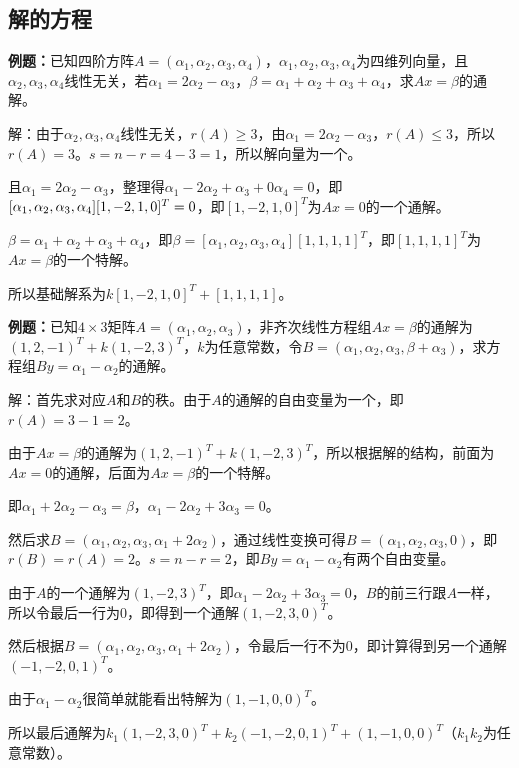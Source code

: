 \subsection{解的方程}

\textbf{例题：}已知四阶方阵$A=(\alpha_1,\alpha_2,\alpha_3,\alpha_4)$，$\alpha_1,\alpha_2,\alpha_3,\alpha_4$为四维列向量，且$\alpha_2,\alpha_3,\alpha_4$线性无关，若$\alpha_1=2\alpha_2-\alpha_3$，$\beta=\alpha_1+\alpha_2+\alpha_3+\alpha_4$，求$Ax=\beta$的通解。

解：由于$\alpha_2,\alpha_3,\alpha_4$线性无关，$r(A)\geqslant3$，由$\alpha_1=2\alpha_2-\alpha_3$，$r(A)\leqslant3$，所以$r(A)=3$。$s=n-r=4-3=1$，所以解向量为一个。

且$\alpha_1=2\alpha_2-\alpha_3$，整理得$\alpha_1-2\alpha_2+\alpha_3+0\alpha_4=0$，即$[\alpha_1,\alpha_2,\alpha_3,\alpha_4][1,-2,1,0]^T\\=0$，即$[1,-2,1,0]^T$为$Ax=0$的一个通解。

$\beta=\alpha_1+\alpha_2+\alpha_3+\alpha_4$，即$\beta=[\alpha_1,\alpha_2,\alpha_3,\alpha_4][1,1,1,1]^T$，即$[1,1,1,1]^T$为$Ax=\beta$的一个特解。

所以基础解系为$k[1,-2,1,0]^T+[1,1,1,1]$。

\textbf{例题：}已知$4\times3$矩阵$A=(\alpha_1,\alpha_2,\alpha_3)$，非齐次线性方程组$Ax=\beta$的通解为$(1,2,-1)^T+k(1,-2,3)^T$，$k$为任意常数，令$B=(\alpha_1,\alpha_2,\alpha_3,\beta+\alpha_3)$，求方程组$By=\alpha_1-\alpha_2$的通解。

解：首先求对应$A$和$B$的秩。由于$A$的通解的自由变量为一个，即$r(A)=3-1=2$。

由于$Ax=\beta$的通解为$(1,2,-1)^T+k(1,-2,3)^T$，所以根据解的结构，前面为$Ax=0$的通解，后面为$Ax=\beta$的一个特解。

即$\alpha_1+2\alpha_2-\alpha_3=\beta$，$\alpha_1-2\alpha_2+3\alpha_3=0$。

然后求$B=(\alpha_1,\alpha_2,\alpha_3,\alpha_1+2\alpha_2)$，通过线性变换可得$B=(\alpha_1,\alpha_2,\alpha_3,0)$，即$r(B)=r(A)=2$。$s=n-r=2$，即$By=\alpha_1-\alpha_2$有两个自由变量。

由于$A$的一个通解为$(1,-2,3)^T$，即$\alpha_1-2\alpha_2+3\alpha_3=0$，$B$的前三行跟$A$一样，所以令最后一行为0，即得到一个通解$(1,-2,3,0)^T$。

然后根据$B=(\alpha_1,\alpha_2,\alpha_3,\alpha_1+2\alpha_2)$，令最后一行不为0，即计算得到另一个通解$(-1,-2,0,1)^T$。

由于$\alpha_1-\alpha_2$很简单就能看出特解为$(1,-1,0,0)^T$。

所以最后通解为$k_1(1,-2,3,0)^T+k_2(-1,-2,0,1)^T+(1,-1,0,0)^T$（$k_1k_2$为任意常数）。

